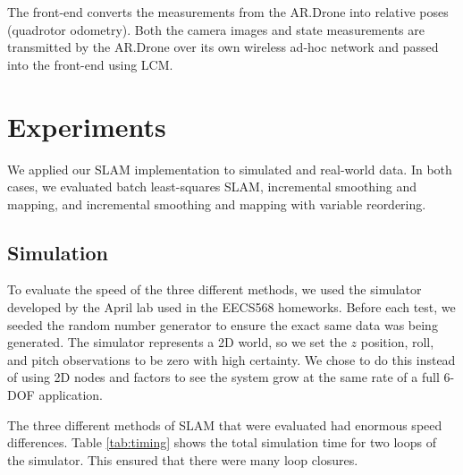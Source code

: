 \documentclass[conference]{IEEEtran}
\begin{document}

The front-end converts the measurements from the AR.Drone into relative poses (quadrotor
odometry). Both the camera images and state measurements are transmitted by the AR.Drone
over its own wireless ad-hoc network and passed into the front-end using LCM.


\section{Experiments}
\label{sec:experiments}

We applied our \ac{SLAM} implementation to simulated and real-world data. In both cases, we
evaluated batch least-squares \ac{SLAM}, incremental smoothing and mapping, and incremental
smoothing and mapping with variable reordering. 

\subsection{Simulation}
\label{sub:simulation}


To evaluate the speed of the three different methods, we used the simulator developed by
the April lab used in the EECS568 homeworks. Before each test, we seeded the random number
generator to ensure the exact same data was being generated. The simulator represents a 2D
world, so we set the $z$ position, roll, and pitch observations to be zero with high
certainty. We chose to do this instead of using 2D nodes and factors to see the system
grow at the same rate of a full 6-\ac{DOF} application.

The three different methods of \ac{SLAM} that were evaluated had enormous speed
differences. Table \ref{tab:timing} shows the total simulation time for two loops of the
simulator. This ensured that there were many loop closures.
\end{document}
